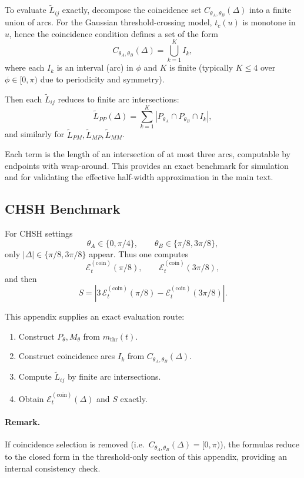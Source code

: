 To evaluate $\tilde L_{ij}$ exactly, decompose the coincidence set $C_{\theta_A,\theta_B}(\Delta)$ into a finite union of arcs.
For the Gaussian threshold-crossing model, $t_c(u)$ is monotone in $u$, hence the coincidence condition defines a set of the form
\begin{equation}
C_{\theta_A,\theta_B}(\Delta)=\bigcup_{k=1}^{K} I_k,
\end{equation}
where each $I_k$ is an interval (arc) in $\phi$ and $K$ is finite (typically $K\le 4$ over $\phi\in[0,\pi)$ due to periodicity and symmetry).

Then each $\tilde L_{ij}$ reduces to finite arc intersections:
\begin{equation}
\tilde L_{PP}(\Delta)=\sum_{k=1}^{K} |P_{\theta_A}\cap P_{\theta_B}\cap I_k|,
\end{equation}
and similarly for $\tilde L_{PM},\tilde L_{MP},\tilde L_{MM}$.

Each term is the length of an intersection of at most three arcs, computable by endpoints with wrap-around. This provides an exact benchmark for simulation and for validating the effective half-width approximation in the main text.

\subsection{CHSH Benchmark}

For CHSH settings
\begin{equation}
\theta_A\in\{0,\pi/4\},
\qquad
\theta_B\in\{\pi/8,3\pi/8\},
\end{equation}
only $|\Delta|\in\{\pi/8,3\pi/8\}$ appear. Thus one computes
\begin{equation}
\mathcal{E}_t^{\mathrm{(coin)}}(\pi/8),\qquad
\mathcal{E}_t^{\mathrm{(coin)}}(3\pi/8),
\end{equation}
and then
\begin{equation}
\boxed{
S=
\left|
3\,\mathcal{E}_t^{\mathrm{(coin)}}(\pi/8)
-
\mathcal{E}_t^{\mathrm{(coin)}}(3\pi/8)
\right|.
}
\end{equation}

This appendix supplies an exact evaluation route:
\begin{enumerate}
    \item Construct $P_\theta, M_\theta$ from $m_{\mathrm{thr}}(t)$.
    \item Construct coincidence arcs $I_k$ from $C_{\theta_A,\theta_B}(\Delta)$.
    \item Compute $\tilde L_{ij}$ by finite arc intersections.
    \item Obtain $\mathcal{E}_t^{\mathrm{(coin)}}(\Delta)$ and $S$ exactly.
\end{enumerate}

\paragraph{Remark.}
If coincidence selection is removed (i.e.\ $C_{\theta_A,\theta_B}(\Delta)=[0,\pi)$), the formulas reduce to the closed form in the threshold-only section of this appendix, providing an internal consistency check.
